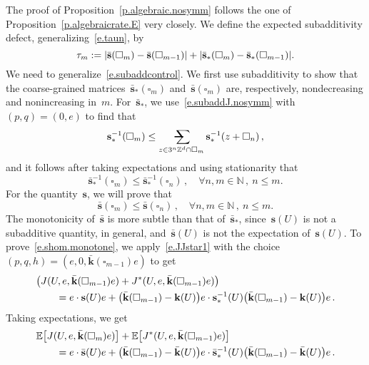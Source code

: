 \documentclass[11pt,twoside]{article} %
\makeatletter
\let\oldsquare\square %
\renewcommand{\square}{\oldsquare}
\numberwithin{equation}{section}
\theoremstyle{definition}
\let\originalleft\left
\let\originalright\right
\renewcommand{\left}{\mathopen{}\mathclose\bgroup\originalleft}
\renewcommand{\right}{\aftergroup\egroup\originalright}
\newcommand*{\N}{\ensuremath{\mathbb{N}}}
\newcommand*{\Zd}{\ensuremath{\mathbb{Z}^d}}
\newcommand{\s}{\mathbf{s}}
\renewcommand{\k}{\mathbf{k}}
\newcommand{\shom}{\bar{\mathbf{s}}}
\newcommand{\khom}{\bar{\mathbf{k}}}
\newcommand{\cu}{\square}
\newcommand{\E}{\mathbb{E}}
\newcommand{\avsum}{\mathop{\mathpalette\avsuminner\relax}\displaylimits}
\newcommand\avsuminner[2]{%
  {\sbox0{$\m@th#1\sum$}%
   \vphantom{\usebox0}%
   \ooalign{%
     \hidewidth
     \smash{\,\rule[.23em]{8.8pt}{1.1pt} \relax}%
     \hidewidth\cr
   ~$\m@th#1\sum$\cr
   }%
  }%
}
\makeatother
\begin{document}
The proof of Proposition~\ref{p.algebraic.nosymm} follows the one of Proposition~\ref{p.algebraicrate.E} very closely. 
We define the expected subadditivity defect, generalizing~\eqref{e.taun}, by
\begin{equation}
\label{e.taun.nosymm}
\tau_m := \left|\shom (\cu_{m}) - \shom(\cu_{m-1} )\right| + \left|  \shom_*(\cu_{m}) - \shom_*(\cu_{m-1} )\right|.
\end{equation}
We need to generalize~\eqref{e.subaddcontrol}. We first use subadditivity to show that the coarse-grained matrices~$\shom_*(\cu_m)$ and~$\shom(\cu_m)$ are, respectively, nondecreasing and nonincreasing in~$m$. For~$\shom_*$, we use~\eqref{e.subaddJ.nosymm} with~$(p,q)=(0,e)$ to find that 
\begin{equation*}
\s_*^{-1}(\cu_m) \leq 
\avsum_{z\in 3^n\Zd \cap \cu_m} 
\s_*^{-1}(z+\cu_n)\,,
\end{equation*}
and it follows after taking expectations and using stationarity that 
\begin{equation}
\label{e.shom.star.monotone}
\shom_*^{-1} (\cu_m) \leq \shom_*^{-1}(\cu_n) \,, \quad \forall n,m\in\N\,, \ n \leq m. 
\end{equation}
For the quantity~$\s$, we will prove that
\begin{equation}
\label{e.shom.monotone}
\shom (\cu_m) \leq \shom (\cu_n) \,, \quad \forall n,m\in\N\,, \ n \leq m. 
\end{equation}
The monotonicity of~$\shom$ is more subtle than that of~$\shom_*$, since~$\s(U)$ is not a subadditive quantity, in general, and~$\shom(U)$ is not the expectation of~$\s(U)$. To prove~\eqref{e.shom.monotone}, we apply~\eqref{e.JJstar1} with the choice~$(p,q,h) = (e,0,\khom(\cu_{m-1})e)$ to get
\begin{align}
\label{e.JJstar.noq}
\lefteqn{ 
\bigl ( J(U,e,\khom(\cu_{m-1})e) + J^*(U,e,\khom(\cu_{m-1})e) \bigr )
} \qquad & 
\notag \\ & 
=
e \cdot \s(U) e
+
\bigl ( \khom(\cu_{m-1}) -\k(U) \bigr )e  \cdot \s_*^{-1}(U)\bigl ( \khom(\cu_{m-1}) -\k(U) \bigr ) e
\,.
\end{align}
Taking expectations, we get 
\begin{align}
\label{e.JJstar.noq.annealed}
\lefteqn{ 
\E \bigl[ J(U,e,\khom(\cu_m)e) \bigr] + \E \bigl[ J^*(U,e,\khom(\cu_{m-1})e) \bigr ]
} \qquad & 
\notag \\ & 
=
e \cdot \shom(U) e
+
\bigl ( \khom(\cu_{m-1}) -\khom(U) \bigr )e  \cdot \shom_*^{-1}(U)\bigl ( \khom(\cu_{m-1}) -\khom(U) \bigr ) e
\,.
\end{align}
\end{document}
